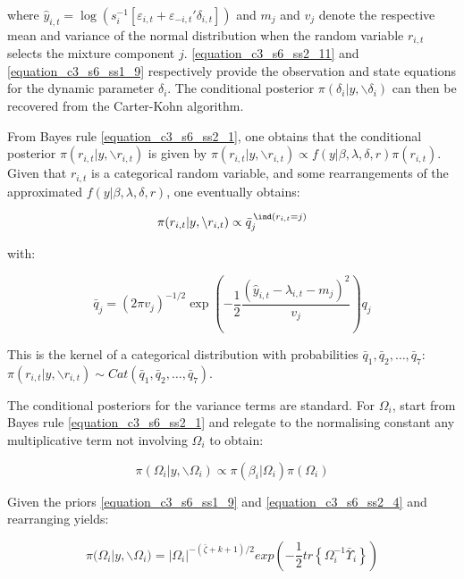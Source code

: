 where $\hat{y}_{i,t} = \log(s_i^{-1} [\varepsilon_{i,t} + \varepsilon_{-i,t}' \delta_{i,t}])$ and $m_j$ and $v_j$ denote the respective mean and variance of the normal distribution when the random variable $r_{i,t}$ selects the mixture component $j$. \ref{equation_c3_s6_ss2_11} and \ref{equation_c3_s6_ss1_9} respectively provide the observation and state equations for the dynamic parameter $\delta_i$. The conditional posterior $\pi(\delta_i | y, \backslash \delta_i)$ can then be recovered from the Carter-Kohn algorithm.

From Bayes rule \ref{equation_c3_s6_ss2_1}, one obtains that the conditional posterior $\pi(r_{i,t}|y, \backslash r_{i,t})$ is given by $\pi(r_{i,t}|y, \backslash r_{i,t}) \propto f(y|\beta, \lambda, \delta, r) \pi(r_{i,t})$. Given that $r_{i,t}$ is a categorical random variable, and some rearrangements of the approximated $f(y|\beta, \lambda, \delta, r)$, one eventually obtains:

\begin{equation}
\pi(r_{i,t}|y, \backslash r_{i,t}) \propto \bar{q}_j^{\hspace{0.5mm} \ind(r_{i,t}=j)}
\label{equation_c3_s6_ss2_12} 
\end{equation}

with:

\begin{equation}
\bar{q}_j=(2\pi v_j)^{-1/2} \exp\left(-\frac{1}{2} \frac{(\hat{y}_{i,t}-\lambda_{i,t}-m_j)^2}{v_j} \right) q_j
\label{equation_c3_s6_ss2_13} 
\end{equation}

This is the kernel of a categorical distribution with probabilities $\bar{q}_1,\bar{q}_2,\ldots,\bar{q}_7$:
 $\pi(r_{i,t}|y, \backslash r_{i,t}) \sim Cat(\bar{q}_1,\bar{q}_2,\ldots,\bar{q}_7)$.

The conditional posteriors for the variance terms are standard. For $\Omega_i$, start from Bayes rule \ref{equation_c3_s6_ss2_1} and relegate to the normalising constant any multiplicative term not involving $\Omega_i$ to obtain:

\begin{equation}
\pi(\Omega_i |y, \backslash \Omega_i) \propto \pi(\beta_i|\Omega_i) \pi(\Omega_i)
\label{equation_c3_s6_ss2_14} 
\end{equation}

Given the priors \ref{equation_c3_s6_ss1_9}  and \ref{equation_c3_s6_ss2_4} and rearranging yields:

\begin{equation}
\pi(\Omega_i |y, \backslash \Omega_i) = |\Omega_i|^{-(\bar{\zeta}+k+1)/2} exp \left( -\frac{1}{2} tr \left\{ \Omega_i^{-1} \bar{\Upsilon}_i \right\} \right)
\label{equation_c3_s6_ss2_15}
\end{equation}

